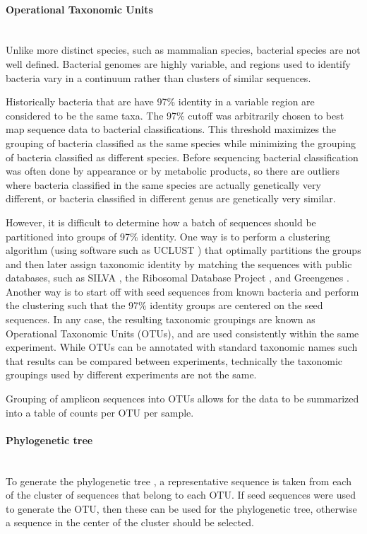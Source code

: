 \documentclass[10pt,letterpaper]{article}
\begin{document}
\paragraph{Operational Taxonomic Units}\mbox{}\\
Unlike more distinct species, such as mammalian species, bacterial species are not well defined. Bacterial genomes are highly variable, and regions used to identify bacteria vary in a continuum rather than clusters of similar sequences.

Historically bacteria that are have 97\% identity in a variable region are considered to be the same taxa. The 97\% cutoff was arbitrarily chosen to best map sequence data to bacterial classifications. This threshold maximizes the grouping of bacteria classified as the same species while minimizing the grouping of bacteria classified as different species. Before sequencing bacterial classification was often done by appearance or by metabolic products, so there are outliers where bacteria classified in the same species are actually genetically very different, or bacteria classified in different genus are genetically very similar.

However, it is difficult to determine how a batch of sequences should be partitioned into groups of 97\% identity. One way is to perform a clustering algorithm (using software such as UCLUST \cite{edgar2010search}) that optimally partitions the groups and then later assign taxonomic identity by matching the sequences with public databases, such as SILVA \cite{quast2013silva}, the Ribosomal Database Project \cite{cole2009ribosomal}, and Greengenes \cite{desantis2006greengenes}. Another way is to start off with seed sequences from known bacteria and perform the clustering such that the 97\% identity groups are centered on the seed sequences. In any case, the resulting taxonomic groupings are known as Operational Taxonomic Units (OTUs), and are used consistently within the same experiment. While OTUs can be annotated with standard taxonomic names such that results can be compared between experiments, technically the taxonomic groupings used by different experiments are not the same.

Grouping of amplicon sequences into OTUs allows for the data to be summarized into a table of counts per OTU per sample.

\paragraph{Phylogenetic tree}\mbox{}\\
To generate the phylogenetic tree \cite{ciccarelli2006toward}, a representative sequence is taken from each of the cluster of sequences that belong to each OTU. If seed sequences were used to generate the OTU, then these can be used for the phylogenetic tree, otherwise a sequence in the center of the cluster should be selected.
\end{document}
